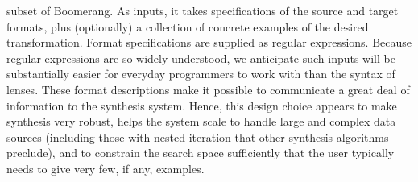 \documentclass[numbers,10pt,preprint\ifanon ,nocopyrightspace\fi]{sigplanconf}
\begin{document}
subset of Boomerang.
As inputs, it takes specifications of the source and target formats, plus
(optionally) a collection of concrete examples of the desired
transformation.  Format specifications are supplied as regular expressions.
Because regular expressions are so widely understood, we anticipate such
inputs will be substantially easier for everyday programmers to work with
than the syntax of lenses.  These format descriptions make it possible to
communicate a great deal of information to the synthesis system.  Hence, this
design choice appears to make synthesis very robust, helps the system scale
to handle large and complex data sources (including those with nested
iteration that other synthesis algorithms preclude), and to constrain the
search space sufficiently that the user typically needs to give very few, if
any, examples.


\end{document}
